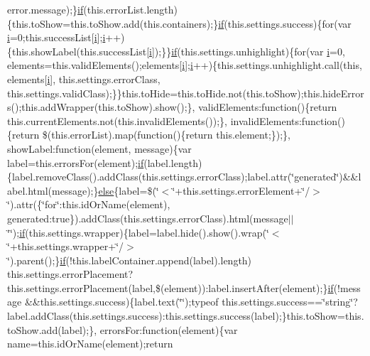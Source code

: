 \begin{DoxyCompactItemize}
error.\+message);\}\hyperlink{_scripts_2respond_8min_8js_a93851d60dd037a83509a1757b9ee7b66}{if}(this.\+error\+List.\+length)\{this.\+to\+Show=this.\+to\+Show.\+add(this.\+containers);\}\hyperlink{_scripts_2respond_8min_8js_a93851d60dd037a83509a1757b9ee7b66}{if}(this.\+settings.\+success)\{for(var \hyperlink{jquery_8unobtrusive-ajax_8min_8js_a84da5ff1aa6008a770fb28040f6b0569}{i}=0;this.\+success\+List\mbox{[}\hyperlink{jquery_8unobtrusive-ajax_8min_8js_a84da5ff1aa6008a770fb28040f6b0569}{i}\mbox{]};\hyperlink{jquery_8unobtrusive-ajax_8min_8js_a84da5ff1aa6008a770fb28040f6b0569}{i}++)\{this.\+show\+Label(this.\+success\+List\mbox{[}\hyperlink{jquery_8unobtrusive-ajax_8min_8js_a84da5ff1aa6008a770fb28040f6b0569}{i}\mbox{]});\}\}\hyperlink{_scripts_2respond_8min_8js_a93851d60dd037a83509a1757b9ee7b66}{if}(this.\+settings.\+unhighlight)\{for(var \hyperlink{jquery_8unobtrusive-ajax_8min_8js_a84da5ff1aa6008a770fb28040f6b0569}{i}=0, elements=this.\+valid\+Elements();elements\mbox{[}\hyperlink{jquery_8unobtrusive-ajax_8min_8js_a84da5ff1aa6008a770fb28040f6b0569}{i}\mbox{]};\hyperlink{jquery_8unobtrusive-ajax_8min_8js_a84da5ff1aa6008a770fb28040f6b0569}{i}++)\{this.\+settings.\+unhighlight.\+call(this, elements\mbox{[}\hyperlink{jquery_8unobtrusive-ajax_8min_8js_a84da5ff1aa6008a770fb28040f6b0569}{i}\mbox{]}, this.\+settings.\+error\+Class, this.\+settings.\+valid\+Class);\}\}this.\+to\+Hide=this.\+to\+Hide.\+not(this.\+to\+Show);this.\+hide\+Errors();this.\+add\+Wrapper(this.\+to\+Show).show();\}, valid\+Elements\+:function()\{return this.\+current\+Elements.\+not(this.\+invalid\+Elements());\}, invalid\+Elements\+:function()\{return \$(this.\+error\+List).map(function()\{return this.\+element;\});\}, show\+Label\+:function(element, message)\{var label=this.\+errors\+For(element);\hyperlink{_scripts_2respond_8min_8js_a93851d60dd037a83509a1757b9ee7b66}{if}(label.\+length)\{label.\+remove\+Class().add\+Class(this.\+settings.\+error\+Class);label.\+attr(\char`\"{}generated\char`\"{})\&\&label.\+html(message);\}\hyperlink{_scripts_2jquery_8validate_8js_a0544c3fe466e421738dae463968b70ba}{else}\{label=\$(\char`\"{}$<$\char`\"{}+this.\+settings.\+error\+Element+\char`\"{}/$>$\char`\"{}).attr(\{\char`\"{}for\char`\"{}\+:this.\+id\+Or\+Name(element), generated\+:true\}).add\+Class(this.\+settings.\+error\+Class).html(message$\vert$$\vert$\char`\"{}\char`\"{});\hyperlink{_scripts_2respond_8min_8js_a93851d60dd037a83509a1757b9ee7b66}{if}(this.\+settings.\+wrapper)\{label=label.\+hide().show().wrap(\char`\"{}$<$\char`\"{}+this.\+settings.\+wrapper+\char`\"{}/$>$\char`\"{}).parent();\}\hyperlink{_scripts_2respond_8min_8js_a93851d60dd037a83509a1757b9ee7b66}{if}(!this.\+label\+Container.\+append(label).length) this.\+settings.\+error\+Placement?this.\+settings.\+error\+Placement(label,\$(element))\+:label.\+insert\+After(element);\}\hyperlink{_scripts_2respond_8min_8js_a93851d60dd037a83509a1757b9ee7b66}{if}(!message \&\&this.\+settings.\+success)\{label.\+text(\char`\"{}\char`\"{});typeof this.\+settings.\+success==\char`\"{}string\char`\"{}?label.\+add\+Class(this.\+settings.\+success)\+:this.\+settings.\+success(label);\}this.\+to\+Show=this.\+to\+Show.\+add(label);\}, errors\+For\+:function(element)\{var name=this.\+id\+Or\+Name(element);return 
\end{DoxyCompactItemize}
